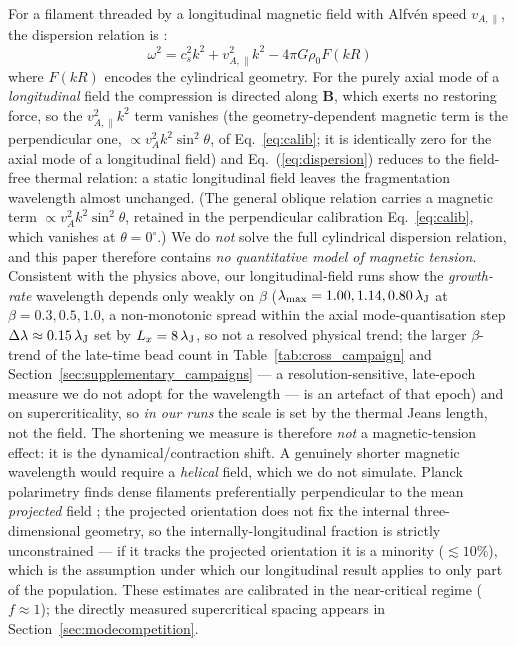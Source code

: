 \documentclass[usenatbib,twoside,twocolumn]{mnras}
\begin{document}
For a filament threaded by a longitudinal magnetic field with Alfv\'en speed $v_{A,\parallel}$, the dispersion relation is \citep{Nakamura1993}:
\begin{equation}
\omega^2 = c_s^2 k^2 + v_{A,\parallel}^2 k^2 - 4\pi G\rho_0 F(kR)
\label{eq:dispersion}
\end{equation}
where $F(kR)$ encodes the cylindrical geometry. For the purely axial mode of a \emph{longitudinal} field the compression is directed along $\mathbf{B}$, which exerts no restoring force, so the $v_{A,\parallel}^2k^2$ term vanishes (the geometry-dependent magnetic term is the perpendicular one, $\propto v_A^2k^2\sin^2\theta$, of Eq.~\ref{eq:calib}; it is identically zero for the axial mode of a longitudinal field) and Eq.~(\ref{eq:dispersion}) reduces to the field-free thermal relation: a static longitudinal field leaves the fragmentation wavelength almost unchanged. (The general oblique relation carries a magnetic term $\propto v_A^2k^2\sin^2\theta$, retained in the perpendicular calibration Eq.~\ref{eq:calib}, which vanishes at $\theta=0^\circ$.) We do \emph{not} solve the full cylindrical dispersion relation, and this paper therefore contains \emph{no quantitative model of magnetic tension}. Consistent with the physics above, our longitudinal-field runs show the \emph{growth-rate} wavelength depends only weakly on $\beta$ ($\lambda_{\rm max}=1.00,1.14,0.80\,\lambda_{\rm J}$ at $\beta=0.3,0.5,1.0$, a non-monotonic spread within the axial mode-quantisation step $\Delta\lambda\approx0.15\,\lambda_{\rm J}$ set by $L_x=8\,\lambda_{\rm J}$, so not a resolved physical trend; the larger $\beta$-trend of the late-time bead count in Table~\ref{tab:cross_campaign} and Section~\ref{sec:supplementary_campaigns} --- a resolution-sensitive, late-epoch measure we do not adopt for the wavelength --- is an artefact of that epoch) and on supercriticality, so \emph{in our runs} the scale is set by the thermal Jeans length, not the field. The shortening we measure is therefore \emph{not} a magnetic-tension effect: it is the dynamical/contraction shift. A genuinely shorter magnetic wavelength would require a \emph{helical} field, which we do not simulate. Planck polarimetry finds dense filaments preferentially perpendicular to the mean \emph{projected} field \citep{Jadhav2026}; the projected orientation does not fix the internal three-dimensional geometry, so the internally-longitudinal fraction is strictly unconstrained --- if it tracks the projected orientation it is a minority ($\lesssim10\%$), which is the assumption under which our longitudinal result applies to only part of the population. These estimates are calibrated in the near-critical regime ($f\approx1$); the directly measured supercritical spacing appears in Section~\ref{sec:modecompetition}.
\end{document}
